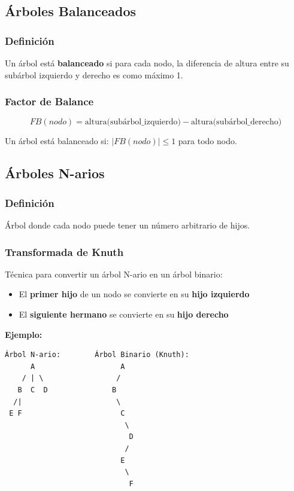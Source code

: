 \documentclass[12pt,a4paper]{article}
\begin{document}
\subsection{Árboles Balanceados}

\subsubsection{Definición}
Un árbol está \textbf{balanceado} si para cada nodo, la diferencia de altura entre su subárbol izquierdo y derecho es como máximo 1.

\subsubsection{Factor de Balance}
$$FB(nodo) = \text{altura(subárbol\_izquierdo)} - \text{altura(subárbol\_derecho)}$$

Un árbol está balanceado si: $|FB(nodo)| \leq 1$ para todo nodo.

\subsection{Árboles N-arios}

\subsubsection{Definición}
Árbol donde cada nodo puede tener un número arbitrario de hijos.

\subsubsection{Transformada de Knuth}
Técnica para convertir un árbol N-ario en un árbol binario:
\begin{itemize}
    \item El \textbf{primer hijo} de un nodo se convierte en su \textbf{hijo izquierdo}
    \item El \textbf{siguiente hermano} se convierte en su \textbf{hijo derecho}
\end{itemize}

\textbf{Ejemplo:}
\begin{verbatim}
Árbol N-ario:        Árbol Binario (Knuth):
      A                    A
    / | \                 /
   B  C  D               B
  /|                      \
 E F                       C
                            \
                             D
                            /
                           E
                            \
                             F
\end{verbatim}
\end{document}
